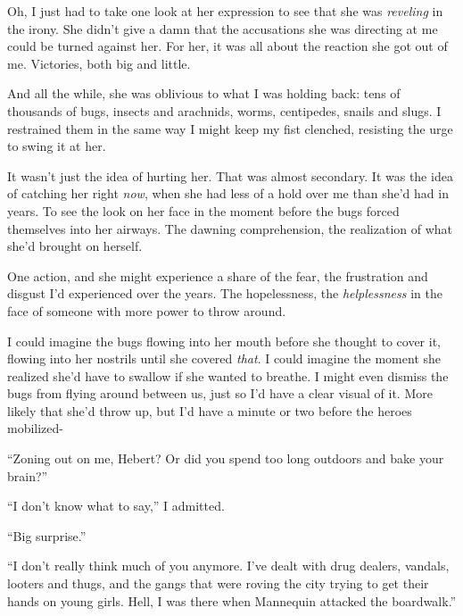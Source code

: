 Oh, I just had to take one look at her expression to see that she was \emph{reveling} in the irony.  She didn't give a damn that the accusations she was directing at me could be turned against her.  For her, it was all about the reaction she got out of me.  Victories, both big and little.



And all the while, she was oblivious to what I was holding back: tens of thousands of bugs, insects and arachnids, worms, centipedes, snails and slugs.  I restrained them in the same way I might keep my fist clenched, resisting the urge to swing it at her.



It wasn't just the idea of hurting her.  That was almost secondary.  It was the idea of catching her right \emph{now}, when she had less of a hold over me than she'd had in years.  To see the look on her face in the moment before the bugs forced themselves into her airways.  The dawning comprehension, the realization of what she'd brought on herself.



One action, and she might experience a share of the fear, the frustration and disgust I'd experienced over the years.  The hopelessness, the \emph{helplessness} in the face of someone with more power to throw around.



I could imagine the bugs flowing into her mouth before she thought to cover it, flowing into her nostrils until she covered \emph{that}.  I could imagine the moment she realized she'd have to swallow if she wanted to breathe.  I might even dismiss the bugs from flying around between us, just so I'd have a clear visual of it.  More likely that she'd throw up, but I'd have a minute or two before the heroes mobilized-



``Zoning out on me, Hebert?  Or did you spend too long outdoors and bake your brain?''



``I don't know what to say,'' I admitted.



``Big surprise.''



``\ldotsbecause I don't really think much of you anymore.  I've dealt with drug dealers, vandals, looters and thugs, and the gangs that were roving the city trying to get their hands on young girls.  Hell, I was there when Mannequin attacked the boardwalk.''



